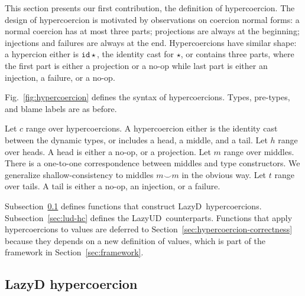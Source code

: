 \documentclass[acmsmall,review,anonymous]{acmart}\settopmatter{printfolios=true,printccs=false,printacmref=false}
\newcommand{\figref}[1]{Fig.~\ref{#1}}
\newcommand{\lazyUD}{Lazy\;UD}
\newcommand{\lazyD}{Lazy\;D}
\newcommand{\TOOdyn}[0]{\star}
\newcommand{\hyperCoercionI}[0]{\mathtt{id\star}}
\begin{document}
This section presents our first contribution, the definition of hypercoercion. 
The design of hypercoercion is motivated by observations on coercion normal 
forms: a normal coercion has at most three parts; projections are always at the 
beginning; injections and failures are always at the end. Hypercoercions have 
similar shape: a hypercion either is $ \hyperCoercionI $, the identity cast for 
$ \TOOdyn $, or contains three parts, where the first part is either a 
projection or a no-op while last part is either an injection, a failure, or a 
no-op.

\figref{fig:hypercoercion} defines the syntax of hypercoercions. Types, 
pre-types, and blame labels are as before.

Let $ c $ range over hypercoercions. A hypercoercion either is the identity 
cast between the dynamic types, or includes a head, a middle, and a tail. 
Let $ h $ range over heads. A head is either a no-op, or a projection.
Let $ m $ range over middles. There is a one-to-one 
correspondence between middles and type constructors. 
We generalize shallow-consistency to middles $ m \smile m $ in the obvious way.
Let $ t $ range over tails. A tail is either a no-op, an injection, or a 
failure.

Subsection~\ref{sec:ld-hc} defines functions that construct \lazyD\ 
hypercoercions. Subsection~\ref{sec:lud-hc} defines the \lazyUD\ counterparts. 
Functions that apply hypercoercions to values are deferred to 
Section~\ref{sec:hypercoercion-correctness} because they depends on a new 
definition of values, which is part of the framework in
Section~\ref{sec:framework}.

\subsection{\lazyD{} hypercoercion}
\label{sec:ld-hc}
\end{document}
